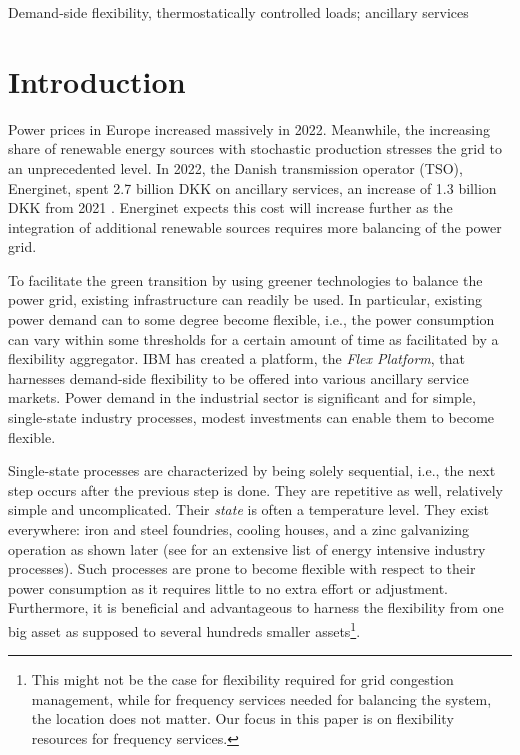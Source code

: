 \documentclass[conference]{IEEEtran}
\begin{document}
\begin{IEEEkeywords}
    Demand-side flexibility, thermostatically controlled loads; ancillary services
\end{IEEEkeywords}


\section{Introduction}

Power prices in Europe increased massively in 2022. Meanwhile, the increasing share of renewable energy sources with stochastic production stresses the grid to an unprecedented level. In 2022, the Danish transmission operator (TSO), Energinet, spent 2.7 billion DKK on ancillary services, an increase of 1.3 billion DKK from 2021 \cite{energinetOmkostninger}. Energinet expects this cost will increase further as the integration of additional renewable sources requires more balancing of the power grid.

To facilitate the green transition by using greener technologies to balance the power grid, existing infrastructure can readily be used. In particular, existing power demand can to some degree become flexible, i.e., the power consumption can vary within some thresholds for a certain amount of time as facilitated by a flexibility aggregator. IBM has created a platform, the \textit{Flex Platform}, that harnesses demand-side flexibility to be offered into various ancillary service markets. Power demand in the industrial sector is significant and for simple, single-state industry processes, modest investments can enable them to become flexible.

Single-state processes are characterized by being solely sequential, i.e., the next step occurs after the previous step is done. They are repetitive as well, relatively simple and uncomplicated. Their \textit{state} is often a temperature level. They exist everywhere: iron and steel foundries, cooling houses, and a zinc galvanizing operation as shown later (see \cite{paulus2011potential} for an extensive list of energy intensive industry processes). Such processes are prone to become flexible with respect to their power consumption as it requires little to no extra effort or adjustment. Furthermore, it is beneficial and advantageous to harness the flexibility from one big asset as supposed to several hundreds smaller assets\footnote{This might not be the case for flexibility required for grid congestion management, while for frequency services needed for balancing the system, the location does not matter. Our focus in this paper is on flexibility resources for frequency services.}.
\end{document}
